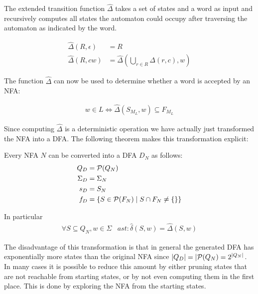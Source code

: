 \begin{definition}
    The extended transition function $\hat\Delta$ takes a set of states and a
    word as input and recursively computes all states the automaton could occupy
    after traversing the automaton as indicated by the word.

    \begin{align}
        \hat\Delta(R, \epsilon) &= R \\
        \hat\Delta(R, c w) &= \hat\Delta(\bigcup\limits_{r \in R} \Delta(r, c), w)
    \end{align}
\end{definition}

The function $\hat\Delta$ can now be used to determine whether a word is accepted by an NFA:

\begin{align}
    w \in L \Leftrightarrow \hat\Delta(S_{M_L}, w) \subseteq F_{M_L}
\end{align}

Since computing $\hat\Delta$ is a deterministic operation
we have actually just transformed the NFA into a DFA.
The following theorem makes this transformation explicit:

\begin{theorem}
    Every NFA $N$ can be converted into a DFA $D_N$ as follows:
    \begin{align}
        Q_D &= \mathcal{P}(Q_N) \\
        \Sigma_D &= \Sigma_N \\
        s_D &= S_N \\
        f_D &= \{ S \in \mathcal{P}(F_N) \mid S \cap F_N \neq \{\} \} \\
    \end{align}

    In particular
    \begin{align}
        \forall S \subseteq Q_N, w \in \Sigma&ast: \hat\delta(S, w) = \hat\Delta(S, w)
    \end{align}
\end{theorem}

The disadvantage of this transformation is that
in general the generated DFA has exponentially more states
than the original NFA since $|Q_D| = |\mathcal{P}(Q_N) = 2^{|Q_N|}$.
In many cases it is possible to reduce this amount by either pruning states
that are not reachable from starting states,
or by not even computing them in the first place.
This is done by exploring the NFA from the starting states.
